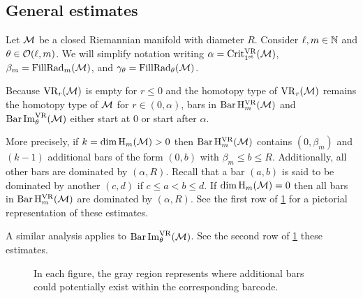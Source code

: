 \subsection{General estimates}\label{ss:barcode_general}

Let \(\mathcal{M}\) be a closed Riemannian manifold with diameter \(R\).
Consider \(\ell, m \in \mathbb{N}\) and \(\theta \in \mathcal{O}(\ell,m)\).
We will simplify notation writing \(\alpha = \operatorname{Crit^{\mathrm{VR}}_{1^{\mathrm{st}}}}(\mathcal{M})\), \(\beta_m = \operatorname{FillRad}_{m}(\mathcal{M})\), and \(\gamma_\theta = \operatorname{FillRad}_{\theta}(\mathcal{M})\).

Because $\mathrm{VR}_r(\mathcal{M})$ is empty for \(r \leq 0\) and the homotopy type of $\mathrm{VR}_r(\mathcal{M})$ remains the homotopy type of $\mathcal{M}$ for $r \in (0, \alpha)$, bars in \(\operatorname{Bar} \mathrm{H}_m^{\mathrm{VR}}(\mathcal{M})\) and $\operatorname{Bar}\operatorname{Im}_\theta^{\mathrm{VR}}(\mathcal{M})$ either start at $0$ or start after $\alpha$.

More precisely,
if \(k = \dim \operatorname{H}_m(\mathcal{M}) > 0\) then $\operatorname{Bar}\mathrm{H}_m^{\mathrm{VR}}(\mathcal{M})$ contains $(0, \beta_m)$ and \((k - 1)\) additional bars of the form \((0, b)\) with \(\beta_m \leq b \leq R\).
Additionally, all other bars are dominated by \((\alpha, R)\).
Recall that a bar $(a, b)$ is said to be dominated by another $(c,d)$ if $c \leq a < b \leq d$.
If \(\dim \operatorname{H}_m(\mathcal{M}) = 0\) then all bars in \(\operatorname{Bar}\mathrm{H}_m^{\mathrm{VR}}(\mathcal{M})\) are dominated by \((\alpha, R)\).
See the first row of \cref{fig:barcodes_general} for a pictorial representation of these estimates.

A similar analysis applies to $\operatorname{Bar}\operatorname{Im}_\theta^{\mathrm{VR}}(\mathcal{M})$.
See the second row of \cref{fig:barcodes_general} these estimates.

\begin{figure}
	\centering
	
	\caption{In each figure, the gray region represents where additional bars could potentially exist within the corresponding barcode.}
	\label{fig:barcodes_general}
\end{figure}